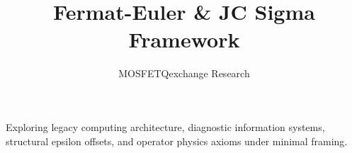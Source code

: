 \documentclass{article}
\title{ Fermat-Euler & JC Sigma Framework}
\author{MOSFETQexchange Research}
\begin{document}
Exploring legacy computing architecture, diagnostic information systems, structural epsilon offsets, and operator physics axioms under minimal framing.
\end{document}
